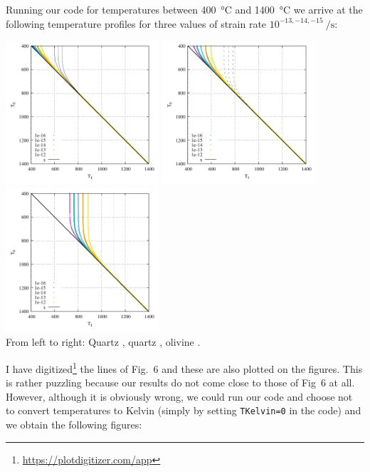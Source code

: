 Running our code for temperatures between 400~\si{\celsius} and 1400~\si{\celsius}
we arrive at the following temperature profiles for three values of strain rate 
$10^{-13,-14,-15}~\si{\per\second}$:

\begin{center}
\includegraphics[width=5.7cm]{python_codes/fieldstone_167/1kelvin/fig6.pdf}
\includegraphics[width=5.7cm]{python_codes/fieldstone_167/2kelvin/fig6.pdf}
\includegraphics[width=5.7cm]{python_codes/fieldstone_167/3kelvin/fig6.pdf}\\
{\captionfont From left to right: Quartz \cite{brko80}, quartz \cite{stsa94}, olivine \cite{brko80}.}
\end{center}

I have digitized\footnote{\url{https://plotdigitizer.com/app}} the lines of Fig.~6
and these are also plotted on the figures.
This is rather puzzling because our results do not come close to those of Fig~6 at all. 
However, although it is obviously wrong, we could run our code and choose not 
to convert temperatures to Kelvin (simply by setting \lstinline|TKelvin=0| in the code) 
and we obtain the following figures:

